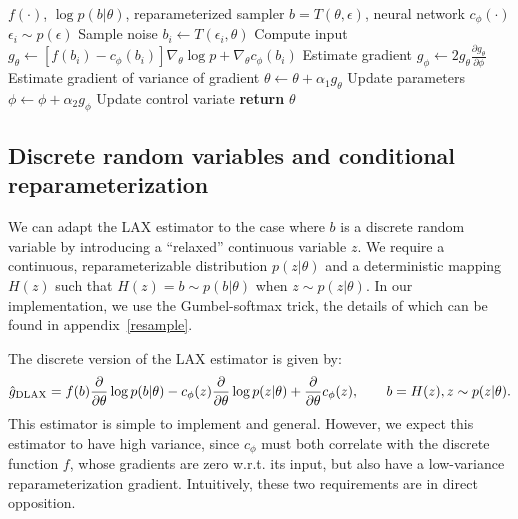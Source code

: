 \documentclass{article}
\newcommand{\PT}{\frac{\partial}{\partial \theta}}
\newcommand{\LAX}{{\textnormal{LAX}}}
\newcommand{\DLAX}{{\textnormal{DLAX}}}
\begin{document}
\begin{algorithm}[h]
\begin{algorithmic}
\Require $f(\cdot)$, $\log p(b|\theta)$, reparameterized sampler $b = T(\theta, \epsilon)$, neural network $c_\phi(\cdot)$
	\State $\epsilon_{i} \sim p(\epsilon)$ \Comment Sample noise
	\State $b_i \leftarrow T(\epsilon_i, \theta)$ \Comment Compute input
	\State  $g_\theta \leftarrow \left[f(b_i) - c_{\phi}(b_i) \right] \nabla_\theta \log p + \nabla_\theta c_\phi(b_i)$ \Comment Estimate gradient
	\State  $g_\phi \leftarrow 2 g_\theta \frac{\partial g_\theta}{\partial \phi}$ \Comment Estimate gradient of variance of gradient
	\State $\theta \leftarrow \theta + \alpha_1 g_\theta$ \Comment Update parameters
	\State $\phi \leftarrow \phi + \alpha_2 g_\phi$ \Comment Update control variate
\EndWhile
\State \textbf{return} $\theta$ 
\end{algorithmic}
\caption{\LAX{}: Optimizing parameters and a gradient control variate simultaneously.}
\label{lax}
\end{algorithm}

\subsection{Discrete random variables and conditional reparameterization}
We can adapt the \LAX{} estimator to the case where $b$ is a discrete random variable by introducing a ``relaxed'' continuous variable $z$.
We require a continuous, reparameterizable distribution $p(z|\theta)$ and a deterministic mapping $H(z)$ such that $H(z) = b \sim p(b|\theta)$ when $z \sim p(z|\theta)$.
In our implementation, we use the Gumbel-softmax trick, the details of which can be found in appendix~\ref{resample}.

The discrete version of the \LAX{} estimator is given by:
%
\begin{align}
\label{eq:discrete lax}
\hat g_\DLAX = f(b) \PT \log p(b|\theta) - c_\phi(z) \PT \log p(z|\theta) + \PT c_\phi(z), \qquad b = H(z), z \sim p(z|\theta).
\end{align}
%
This estimator is simple to implement and general.
However, we expect this estimator to have high variance, since $c_\phi$ must both correlate with the discrete function $f$, whose gradients are zero w.r.t. its input, but also have a low-variance reparameterization gradient.
Intuitively, these two requirements are in direct opposition.
\end{document}
